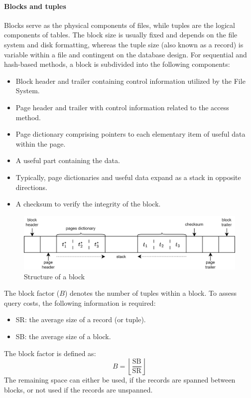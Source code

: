 \paragraph*{Blocks and tuples}
Blocks serve as the physical components of files, while tuples are the logical components of tables.
The block size is usually fixed and depends on the file system and disk formatting, whereas the tuple size (also known as a record) is variable within a file and contingent on the database design.
For sequential and hash-based methods, a block is subdivided into the following components:
\begin{itemize}
    \item Block header and trailer containing control information utilized by the File System.
    \item Page header and trailer with control information related to the access method. 
    \item Page dictionary comprising pointers to each elementary item of useful data within the page.
    \item A useful part containing the data. 
    \item Typically, page dictionaries and useful data expand as a stack in opposite directions.
    \item A checksum to verify the integrity of the block.
\end{itemize}
\begin{figure}[H]
    \centering
    \includegraphics[width=0.75\linewidth]{images/block.png}
    \caption{Structure of a block}
\end{figure} 
The block factor ($B$) denotes the number of tuples within a block. 
To assess query costs, the following information is required:
\begin{itemize}
    \item SR: the average size of a record (or tuple). 
    \item SB: the average size of a block. 
\end{itemize}
The block factor is defined as:
\[B=\left\lfloor \dfrac{\text{SB}}{\text{SR}} \right\rfloor \]
The remaining space can either be used, if the records are spanned between blocks, or not used if the records are unspanned.

